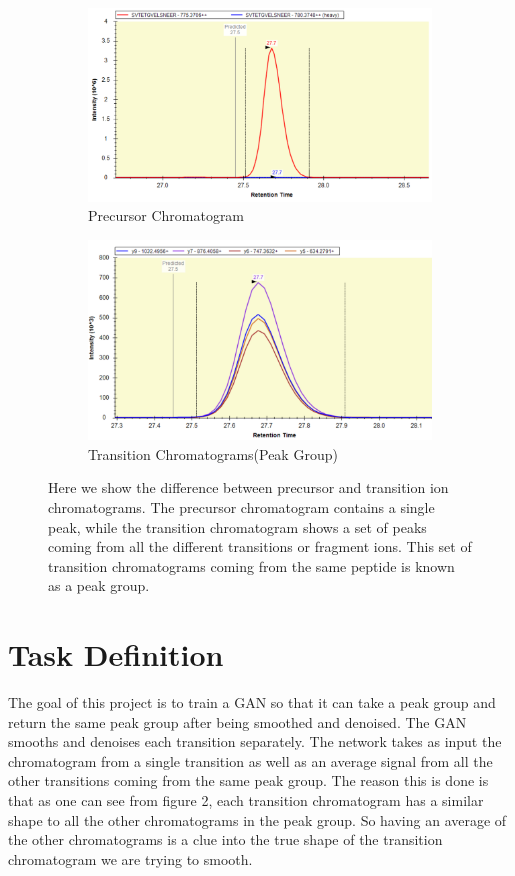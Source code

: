 \documentclass[12pt]{article}
\begin{document}
\begin{figure}
\centering
\begin{subfigure}{.5\textwidth}
  \centering
  \includegraphics[width=1\linewidth]{precursor}
  \caption{Precursor Chromatogram}
  \label{fig:sub1}
\end{subfigure}%
\begin{subfigure}{.5\textwidth}
  \centering
  \includegraphics[width=1\linewidth]{transitions}
  \caption{Transition Chromatograms(Peak Group)}
  \label{fig:sub2}
\end{subfigure}
\caption{Here we show the difference between precursor and transition ion chromatograms. The precursor chromatogram contains a single peak, while the transition chromatogram shows a set of peaks coming from all the different transitions or fragment ions. This set of transition chromatograms coming from the same peptide is known as a peak group.}
\label{fig:test}
\end{figure}


\section{Task Definition}
The goal of this project is to train a GAN so that it can take a peak group and return the same peak group after being smoothed and denoised.  
The GAN smooths and denoises each transition separately. The network takes as input the chromatogram from a single transition as well as an average signal from all the other transitions coming from the same peak group.  The reason this is done is that as one can see from figure 2, each transition chromatogram has a similar shape to all the other chromatograms in the peak group. So having an average of the other chromatograms is a clue into the true shape of the transition chromatogram we are trying to smooth. 
\end{document}
